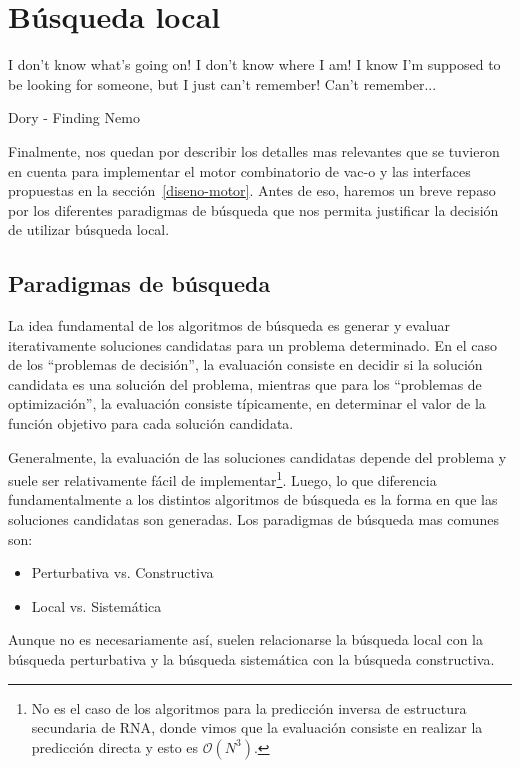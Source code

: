 \chapter{B\'usqueda local}
\label{busqueda}
\epigraph{I don't know what's going on! I don't know where I am! I know I'm
supposed to be looking for someone, but I just can't remember! Can't
remember...}%
{Dory - Finding Nemo}

Finalmente, nos quedan por describir los detalles mas relevantes que se
tuvieron en cuenta para implementar el motor combinatorio de \ac{vac-o} y las
interfaces propuestas en la secci\'on~\ref{diseno-motor}. Antes de eso, haremos
un breve repaso por los diferentes paradigmas de b\'usqueda que nos permita
justificar la decisi\'on de utilizar b\'usqueda local.

\section{Paradigmas de b\'usqueda}

La idea fundamental de los algoritmos de b\'usqueda es generar y evaluar
iterativamente soluciones candidatas para un problema determinado. En el caso de
los ``problemas de decisi\'on'', la evaluaci\'on consiste en decidir si la
soluci\'on candidata es una soluci\'on del problema, mientras que para los
``problemas de optimizaci\'on'', la evaluaci\'on consiste t\'ipicamente,
en determinar el valor de la funci\'on objetivo para cada soluci\'on candidata.

Generalmente, la evaluaci\'on de las soluciones candidatas depende del problema
y suele ser relativamente f\'acil de implementar\footnote{No es el caso de los
algoritmos para la predicci\'on inversa de estructura secundaria de \ac{RNA},
donde vimos que la evaluaci\'on consiste en realizar la predicci\'on directa y
esto es $\mathcal{O}(N^{3})$.}. Luego, lo que diferencia fundamentalmente a los
distintos algoritmos de b\'usqueda es la forma en que las soluciones candidatas
son generadas. Los paradigmas de b\'usqueda mas comunes son:
\begin{itemize}
 \item Perturbativa vs. Constructiva
 \item Local vs. Sistem\'atica
\end{itemize}

Aunque no es necesariamente as\'i, suelen relacionarse la b\'usqueda local con
la b\'usqueda perturbativa y la b\'usqueda sistem\'atica con la b\'usqueda
constructiva.

